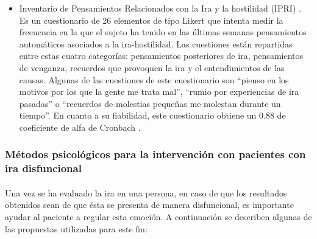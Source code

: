 \begin{itemize}
    \item Inventario de Pensamientos Relacionados con la Ira y la hostilidad (IPRI) \citep{sukhodolsky2001development}. Es un cuestionario de 26 elementos de tipo Likert que intenta medir la frecuencia en la que el sujeto ha tenido en las últimas semanas pensamientos automáticos asociados a la ira-hostilidad. Las cuestiones están repartidas entre estas cuatro categorías: pensamientos posteriores de ira, pensamientos de venganza, recuerdos que provoquen la ira y el entendimientos de las causas. Algunas de las cuestiones de este cuestionario son ``pienso en los motivos por los que la gente me trata mal'', ``rumio por experiencias de ira pasadas'' o ``recuerdos de molestias pequeñas me molestan durante un tiempo''. En cuanto a su fiabilidad, este cuestionario obtiene un 0.88 de coeficiente de alfa de Cronbach \citep{prieto2000modelo}.
\end{itemize}

\subsubsection{Métodos psicológicos para la intervención con pacientes con ira disfuncional}

\paragraph{}
Una vez se ha evaluado la ira en una persona, en caso de que los resultados obtenidos sean de que ésta se presenta de manera disfuncional, es importante ayudar al paciente a regular esta emoción. A continuación se describen algunas de las propuestas utilizadas para este fin:

